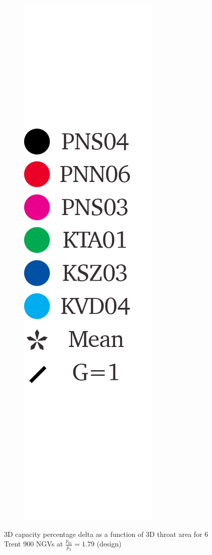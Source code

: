 \documentclass[a4paper, 11pt, oneside]{report}
\begin{document}
\begin{figure}[H]
\begin{subfigure}{.1125\textwidth}
		\includegraphics[width=\linewidth]{figs/t900_throat_widths_legend.png}
	\end{subfigure}
	\caption{3D capacity percentage delta as a function of 3D throat area for 6 Trent 900 NGVs at $\frac{p_{01}}{p_2}=1.79$ (design)}
      \label{fig:T900_2d_capacities_vs_throat_areas}
\end{figure}
\end{document}
